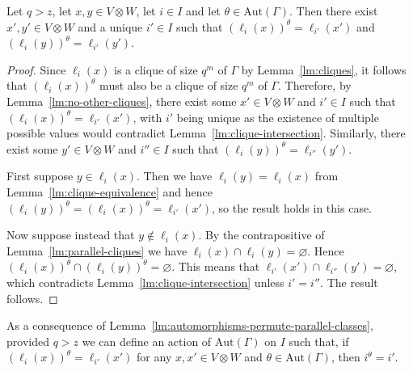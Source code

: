 \documentclass[ALCO, Unicode]{cedram}
\newcommand{\Aut}{\mathrm{Aut}}
\begin{document}
\begin{lemma} \label{lm:automorphisms-permute-parallel-classes}
Let $q > z$, let $x, y \in V \otimes W$, let $i \in I$ and let $\theta \in \Aut{\left(\Gamma \right)}$. Then there exist $x', y' \in V \otimes W$ and a unique $i' \in I$ such that $\left(\ell_i{\left(x \right)}\right)^\theta = \ell_{i'}{\left(x' \right)}$ and $\left(\ell_i{\left(y \right)}\right)^\theta = \ell_{i'}{\left(y' \right)}$.
\end{lemma}
\begin{proof}
Since $\ell_i{\left(x \right)}$ is a clique of size $q^m$ of $\Gamma$ by Lemma~\ref{lm:cliques}, it follows that $\left(\ell_i{\left(x \right)}\right)^\theta$ must also be a clique of size $q^m$ of $\Gamma$. Therefore, by Lemma~\ref{lm:no-other-cliques}, there exist some $x' \in V \otimes W$ and $i' \in I$ such that $\left(\ell_i{\left(x \right)}\right)^\theta = \ell_{i'}{\left(x' \right)}$, with $i'$ being unique as the existence of multiple possible values would contradict Lemma~\ref{lm:clique-intersection}. Similarly, there exist some $y' \in V \otimes W$ and $i'' \in I$ such that $\left(\ell_i{\left(y \right)}\right)^\theta = \ell_{i''}{\left(y' \right)}$.

First suppose $y \in \ell_i{\left(x \right)}$. Then we have $\ell_i{\left(y \right)} = \ell_i{\left(x \right)}$ from Lemma~\ref{lm:clique-equivalence} and hence $\left(\ell_i{\left(y \right)}\right)^\theta = \left(\ell_i{\left(x \right)}\right)^\theta = \ell_{i'}{\left(x' \right)}$, so the result holds in this case.

Now suppose instead that $y \notin \ell_i{\left(x \right)}$. By the contrapositive of Lemma~\ref{lm:parallel-cliques} we have $\ell_i{\left(x \right)} \cap \ell_i{\left(y \right)} = \varnothing$. Hence $\left(\ell_i{\left(x \right)}\right)^\theta \cap \left(\ell_i{\left(y \right)}\right)^\theta = \varnothing$. This means that $\ell_{i'}{\left(x' \right)} \cap \ell_{i''}{\left(y' \right)} = \varnothing$, which contradicts Lemma~\ref{lm:clique-intersection} unless $i' = i''$. The result follows.
\end{proof}

As a consequence of Lemma~\ref{lm:automorphisms-permute-parallel-classes}, provided $q > z$ we can define an action of $\Aut{\left(\Gamma \right)}$ on $I$ such that, if $\left(\ell_i{\left(x \right)}\right)^\theta = \ell_{i'}{\left(x' \right)}$ for any $x, x' \in V \otimes W$ and $\theta \in \Aut{\left(\Gamma \right)}$, then $i^\theta = i'$.
\end{document}
